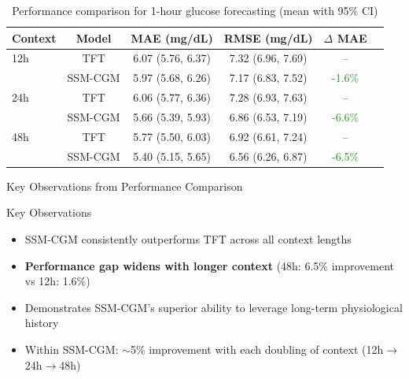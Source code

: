 \documentclass[aspectratio=169,xcolor=dvipsnames]{beamer}
\begin{document}
\begin{frame}
    \begin{table}
        \centering
        \caption{Performance comparison for 1-hour glucose forecasting (mean with 95\% CI)}
        \begin{tabular}{lccccc}
            \toprule
            \textbf{Context} & \textbf{Model} & \textbf{MAE (mg/dL)} & \textbf{RMSE (mg/dL)} & \textbf{$\Delta$ MAE} \\
            \midrule
            12h & TFT & 6.07 (5.76, 6.37) & 7.32 (6.96, 7.69) & -- \\
                & SSM-CGM & 5.97 (5.68, 6.26) & 7.17 (6.83, 7.52) & \textcolor{ForestGreen}{-1.6\%} \\
            \midrule
            24h & TFT & 6.06 (5.77, 6.36) & 7.28 (6.93, 7.63) & -- \\
                & SSM-CGM & 5.66 (5.39, 5.93) & 6.86 (6.53, 7.19) & \textcolor{ForestGreen}{-6.6\%} \\
            \midrule
            48h & TFT & 5.77 (5.50, 6.03) & 6.92 (6.61, 7.24) & -- \\
                & SSM-CGM & 5.40 (5.15, 5.65) & 6.56 (6.26, 6.87) & \textcolor{ForestGreen}{-6.5\%} \\
            \bottomrule
        \end{tabular}
    \end{table}
\end{frame}

\begin{frame}{Key Observations from Performance Comparison}
      
     \begin{block}{Key Observations}
        \begin{itemize}
            \item SSM-CGM consistently outperforms TFT across all context lengths
            \item \textbf{Performance gap widens with longer context} (48h: 6.5\% improvement vs 12h: 1.6\%)
            \item Demonstrates SSM-CGM's superior ability to leverage long-term physiological history
            \item Within SSM-CGM: $\sim$5\% improvement with each doubling of context (12h$\rightarrow$24h$\rightarrow$48h)
        \end{itemize}
    \end{block}
\end{frame}
\end{document}
